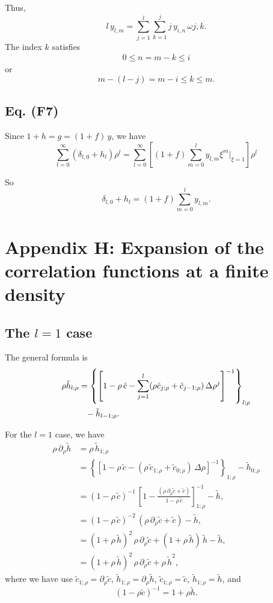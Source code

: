 \documentclass[aip,jcp,reprint,superscriptaddress]{revtex4-1}
\numberwithin{equation}{subsection}
\begin{document}
Thus,
\[
  l \, y_{l,m}
=
\sum_{j = 1}^{l} \sum_{k = 1}^j
j \, y_{i, n} \, \omega{j, k}.
\]
The index $k$ satisfies
\begin{align*}
   0 \le n = m - k \le i
\end{align*}
or
\[
  m - (l - j) = m - i \le k \le m.
\]


\subsection{Eq. (F7)}

Since $1+h = g = (1+f) \,y$, we have
\[
  \sum_{l = 0}^\infty (\delta_{l,0} + h_{l}) \rho^l
=
  \sum_{l = 0}^\infty
  \left[
    (1 + f) \sum_{m = 0}^l y_{l, m} \xi^m \Big|_{\xi = 1}
  \right] \rho^l
\]

So
\[
  \delta_{l, 0} + h_l
  = (1 + f) \sum_{m=0}^l
  y_{l, m}.
\]



\section{Appendix H: Expansion of the correlation functions at a finite density}


\subsection{The $l = 1$ case}

The general formula is
\begin{align}
  \rho \tilde h_{l;\rho}
&=
\left\{
  \left[
    1 - \rho \, \tilde c
    - \sum_{j = 1}^l
        (\rho \tilde c_{j;\rho} + \tilde c_{j-1;\rho})
          \, \Delta \rho^j
  \right]^{-1}
\right\}_{l;\rho}
\notag \\
&\hphantom{=}- \tilde h_{l-1; \rho}.
\end{align}

For the $l = 1$ case, we have
\begin{align*}
  \rho \, \partial_\rho \tilde h
&=
  \rho \, \tilde h_{1;\rho}
\\
&=
\left\{
  \left[
    1 - \rho \, \tilde c
    - (\rho \, \tilde c_{1;\rho} + \tilde c_{0;\rho})
          \, \Delta \rho
  \right]^{-1}
\right\}_{1; \rho}
  - \tilde h_{0; \rho}
\\
&=
(1 - \rho \, \tilde c)^{-1} \,
\left[
  1 - \frac{ (\rho \, \partial_\rho \tilde c + \tilde c) }
           { 1 - \rho \, \tilde c }
\right]^{-1}_{1;\rho}
- \tilde h,
\\
&=
(1 - \rho \, \tilde c)^{-2} \,
(\rho \, \partial_\rho \tilde c + \tilde c)
- \tilde h,
\\
&=
(1 + \rho \, \tilde h)^2 \,
\rho \, \partial_\rho \tilde c
+ (1 + \rho \, \tilde h) \, \tilde h
- \tilde h,
\\
&=
(1 + \rho \, \tilde h)^2 \,
\rho \, \partial_\rho \tilde c
+ \rho \, \tilde h^2,
\end{align*}
where we have use
$\tilde c_{1;\rho} = \partial_\rho \tilde c$,
$\tilde h_{1;\rho} = \partial_\rho \tilde h$,
$\tilde c_{1;\rho} = \tilde c$,
$\tilde h_{1;\rho} = \tilde h$,
and
\[
  (1 - \rho \tilde c)^{-1}
=
  1 + \rho \tilde h.
\]
\end{document}
